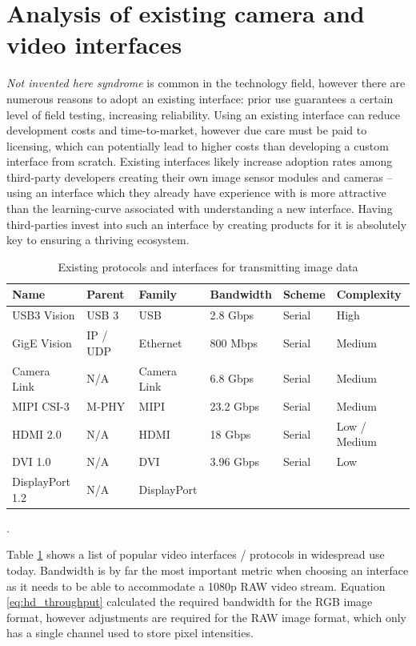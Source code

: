 \section{Analysis of existing camera and video interfaces}
\textit{Not invented here syndrome} is common in the technology field, however there are numerous reasons to adopt an existing interface: prior use guarantees a certain level of field testing, increasing reliability. Using an existing interface can reduce development costs and time-to-market, however due care must be paid to licensing, which can potentially lead to higher costs than developing a custom interface from scratch. Existing interfaces likely increase adoption rates among third-party developers creating their own image sensor modules and cameras – using an interface which they already have experience with is more attractive than the learning-curve associated with understanding a new interface. Having third-parties invest into such an interface by creating products for it is absolutely key to ensuring a thriving ecosystem.

\begin{table}
  \centering
  \begin{tabular}{llllll}
  Name      & Parent  & Family    & Bandwidth & Scheme  & Complexity \\
  \hline
  USB3 Vision   & USB 3   & USB       & 2.8 Gbps  & Serial  & High \\
  GigE Vision   & IP / UDP  & Ethernet    & 800 Mbps  & Serial  & Medium \\
  Camera Link   & N/A     & Camera Link   & 6.8 Gbps  & Serial  & Medium \\
  MIPI CSI-3  & M-PHY   & MIPI      & 23.2 Gbps & Serial  & Medium \\
  HDMI 2.0    & N/A     & HDMI      & 18 Gbps   & Serial  & Low / Medium \\
  DVI 1.0     & N/A     & DVI       & 3.96 Gbps & Serial  & Low \\
  DisplayPort 1.2 & N/A   & DisplayPort   & 
  \end{tabular}
  \caption{Existing protocols and interfaces for transmitting image data \cite{16_von_fintel_2013,17_arrowdevices.com_2014,18_hdmi.org}}.
  \label{table:existing_protocols}
\end{table}

Table \ref{table:existing_protocols} shows a list of popular video interfaces / protocols in widespread use today. Bandwidth is by far the most important metric when choosing an interface as it needs to be able to accommodate a 1080p RAW video stream. Equation \ref{eq:hd_throughput} calculated the required bandwidth for the RGB image format, however adjustments are required for the RAW image format, which only has a single channel used to store pixel intensities. 

